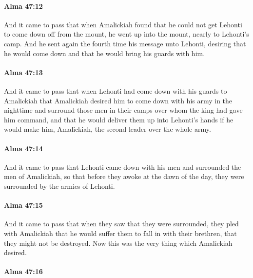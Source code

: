 		\paragraph{Alma 47:12} %
			\label{ALMA-47-12}

			And it came to pass that when Amalickiah found
			that he could not get Lehonti to come down off from the mount,
			he went up into the mount, nearly to Lehonti's camp.
			And he sent again the fourth time his message unto Lehonti,
			desiring that he would come down
			and that he would bring his guards with him.

		\paragraph{Alma 47:13} %
			\label{ALMA-47-13}

			And it came to pass that when Lehonti had come down
			with his guards to Amalickiah
			that Amalickiah desired him to come down with his army in the nighttime
			and surround those men in their camps
			over whom the king had gave him command,
			and that he would deliver them up into Lehonti's hands
			if he would make him, Amalickiah, the second leader over the whole army.

		\paragraph{Alma 47:14} %
			\label{ALMA-47-14}

			And it came to pass that Lehonti came down with his men
			and surrounded the men of Amalickiah,
			so that before they awoke at the dawn of the day,
			they were surrounded by the armies of Lehonti.

		\paragraph{Alma 47:15} %
			\label{ALMA-47-15}

			And it came to pass that when they saw that they were surrounded,
			they pled with Amalickiah
			that he would suffer them to fall in with their brethren,
			that they might not be destroyed.
			Now this was the very thing which Amalickiah desired.

		\paragraph{Alma 47:16} %
			\label{ALMA-47-16}

